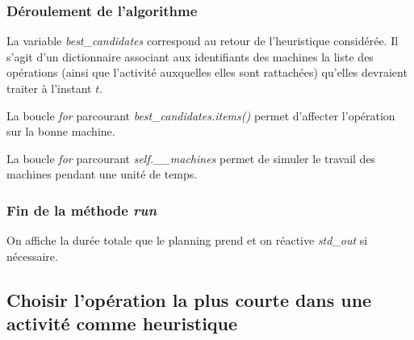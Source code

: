 \newpage

\subsubsection{Déroulement de l'algorithme}



La variable \textit{best\_candidates} correspond au retour de l'heuristique considérée. Il s'agit d'un dictionnaire associant aux identifiants des machines la liste des opérations (ainsi que l'activité auxquelles elles sont rattachées) qu'elles devraient traiter à l'instant $t$.

La boucle \textit{for} parcourant \textit{best\_candidates.items()} permet d'affecter l'opération sur la bonne machine.

La boucle \textit{for} parcourant \textit{self.\_\_machines} permet de simuler le travail des machines pendant une unité de temps.

\subsubsection{Fin de la méthode \textit{run}}



On affiche la durée totale que le planning prend et on réactive \textit{std\_out} si nécessaire. 

\subsection{Choisir l'opération la plus courte dans une activité comme heuristique}

